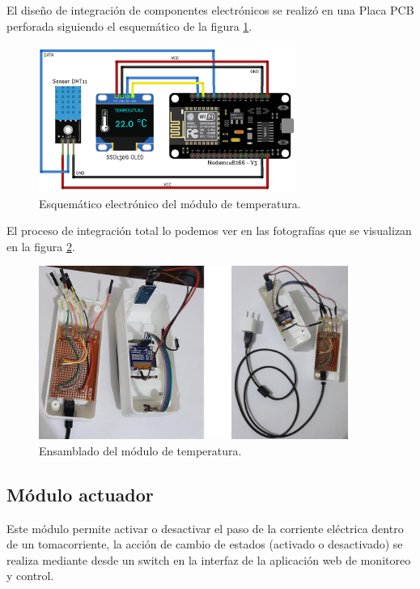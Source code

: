 
El diseño de integración de componentes electrónicos se realizó en una Placa PCB perforada siguiendo el esquemático de la figura \ref{fig:citemp}.

\begin{figure}[htpb]
\centering 
\includegraphics[width=0.75\textwidth]{./Figures/ci-temp.png}
\caption{Esquemático electrónico del módulo de temperatura. }
\label{fig:citemp}
\end{figure}

El proceso de integración total lo podemos ver en las fotografías que se visualizan en la figura \ref{fig:entemp}.

\begin{figure}[htpb]
\centering 
\includegraphics[width=0.9\textwidth]{./Figures/temperatura.jpg}
\caption{Ensamblado del módulo de temperatura. }
\label{fig:entemp}
\end{figure}

\subsection{Módulo actuador}

Este módulo permite activar o desactivar el paso de la corriente eléctrica dentro de un tomacorriente, la acción de cambio de estados (activado o desactivado) se realiza mediante desde un switch en la interfaz de la aplicación web de monitoreo y control.

